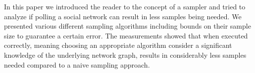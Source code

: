 In this paper we introduced the reader to the concept of a sampler and tried to analyze if polling a social network can result in less samples being needed.
We presented various different sampling algorithms including bounds on their sample size to guarantee a certain error.
The measurements showed that when executed correctly, meaning choosing an appropriate algorithm consider a significant knowledge of the underlying network graph, results in considerably less samples needed compared to a naive sampling approach.
